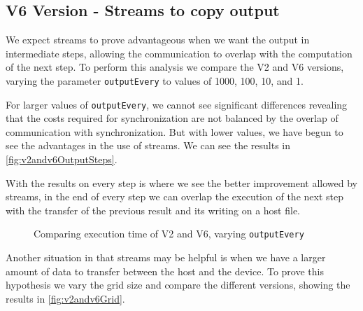 \documentclass[conference]{IEEEtran}
\begin{document}
\subsection{V6 Version - Streams to copy output}
We expect streams to prove advantageous when we want the output in intermediate steps, allowing the communication to overlap with the computation of the next step. To perform this analysis we compare the V2 and V6 versions, varying the parameter \texttt{outputEvery} to values of 1000, 100, 10, and 1.

For larger values of \texttt{outputEvery}, we cannot see significant differences revealing that the costs required for synchronization are not balanced by the overlap of communication with synchronization. But with lower values, we have begun to see the advantages in the use of streams. We can see the results in \autoref{fig:v2andv6OutputSteps}.

With the results on every step is where we see the better improvement allowed by streams, in the end of every step we can overlap the execution of the next step with the transfer of the previous result and its writing on a host file.


\begin{figure}[ht]
  \centering
  \caption{Comparing execution time of V2 and V6, varying \texttt{outputEvery}}
  \label{fig:v2andv6OutputSteps}
\end{figure}



Another situation in that streams may be helpful is when we have a larger amount of data to transfer between the host and the device. To prove this hypothesis we vary the grid size and compare the different versions, showing the results in \autoref{fig:v2andv6Grid}.
\end{document}
